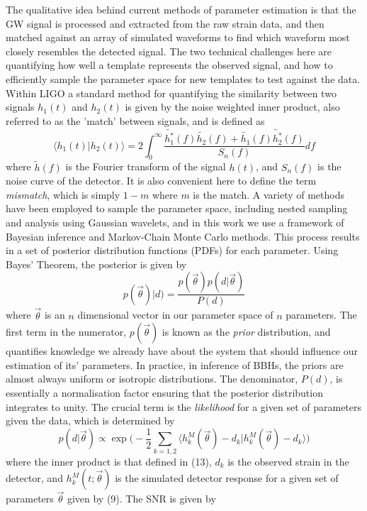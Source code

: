 \documentclass[11pt]{article}
\begin{document}
The qualitative idea behind current methods of parameter estimation is that the GW signal is processed and extracted from the raw strain data, and then matched against an array of simulated waveforms to find which waveform most closely resembles the detected signal. The two technical challenges here are quantifying how well a template represents the observed signal, and how to efficiently sample the parameter space for new templates to test against the data. Within LIGO a standard method for quantifying the similarity between two signals $h_1(t)$ and $h_2(t)$ is given by the noise weighted inner product, also referred to as the 'match' between signals, and is defined as
\begin{equation}
\langle h_1(t) \vert h_2(t) \rangle=2\int_{0}^{\infty}\frac{\tilde{h_1^*}(f)\tilde{h_2}(f)+\tilde{h_1}(f)\tilde{h_2^*}(f)}{S_n(f)}df 
\end{equation}
where $\tilde{h}(f)$ is the Fourier transform of the signal $h(t)$, and $S_n(f)$ is the noise curve of the detector\cite{oldest_pe}. It is also convenient here to define the term \textit{mismatch}, which is simply $1-m$ where $m$ is the match. A variety of methods have been employed to sample the parameter space, including nested sampling\cite{pe2} and analysis using Gaussian wavelets\cite{props}, and in this work we use a framework of Bayesian inference and Markov-Chain Monte Carlo methods\cite{inj}\cite{pe}\cite{pe4}. This process results in a set of posterior distribution functions (PDFs) for each parameter. Using Bayes' Theorem, the posterior is given by
\begin{equation}
p(\vec{\theta})|d)=\frac{p(\vec{\theta})p(d|\vec{\theta})}{P(d)}
\end{equation}
where $\vec{\theta}$ is an $n$ dimensional vector in our parameter space of $n$ parameters\cite{pe2}. The first term in the numerator, $p(\vec{\theta})$ is known as the \textit{prior} distribution, and quantifies knowledge we already have about the system that should influence our estimation of its' parameters. In practice, in inference of BBHs, the priors are almost always uniform or isotropic distributions. The denominator, $P(d)$, is essentially a normalisation factor ensuring that the posterior distribution integrates to unity. The crucial term is the \textit{likelihood} for a given set of parameters given the data, which is determined by
\begin{equation}
p(d|\vec{\theta})\propto \exp\bigg(-\frac{1}{2}\sum_{k=1,2}\Big \langle h^M_k(\vec{\theta})-d_k \big\vert h^M_k(\vec{\theta})-d_k \Big \rangle\bigg)
\end{equation}
where the inner product is that defined in (13), $d_k$ is the observed strain in the detector, and $h_k^M(t;\vec{\theta})$ is the simulated detector response for a given set of parameters $\vec{\theta}$ given by (9). The SNR is given by
\end{document}
